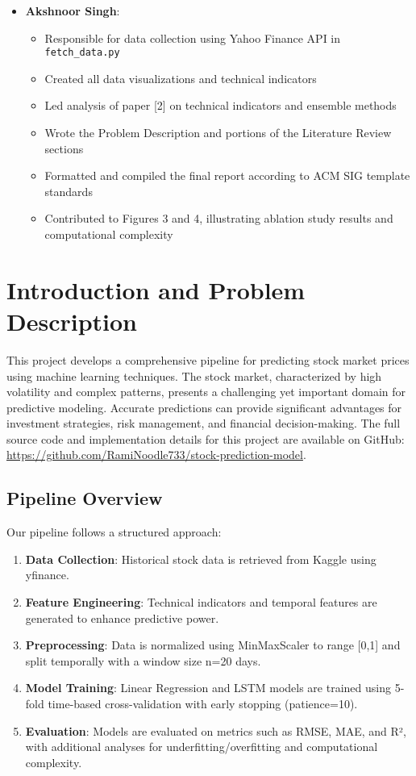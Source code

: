 \documentclass[sigconf]{acmart}
\begin{document}
\begin{itemize}
\item \textbf{Akshnoor Singh}: 
  \begin{itemize}
    \item Responsible for data collection using Yahoo Finance API in \texttt{fetch\_data.py}
    \item Created all data visualizations and technical indicators
    \item Led analysis of paper [2] on technical indicators and ensemble methods
    \item Wrote the Problem Description and portions of the Literature Review sections
    \item Formatted and compiled the final report according to ACM SIG template standards
    \item Contributed to Figures 3 and 4, illustrating ablation study results and computational complexity
  \end{itemize}
\end{itemize}

\section{Introduction and Problem Description}

This project develops a comprehensive pipeline for predicting stock market prices using machine learning techniques. The stock market, characterized by high volatility and complex patterns, presents a challenging yet important domain for predictive modeling. Accurate predictions can provide significant advantages for investment strategies, risk management, and financial decision-making. The full source code and implementation details for this project are available on GitHub: \url{https://github.com/RamiNoodle733/stock-prediction-model}.

\subsection{Pipeline Overview}

Our pipeline follows a structured approach:
\begin{enumerate}
\item \textbf{Data Collection}: Historical stock data is retrieved from Kaggle using yfinance.
\item \textbf{Feature Engineering}: Technical indicators and temporal features are generated to enhance predictive power.
\item \textbf{Preprocessing}: Data is normalized using MinMaxScaler to range [0,1] and split temporally with a window size n=20 days.
\item \textbf{Model Training}: Linear Regression and LSTM models are trained using 5-fold time-based cross-validation with early stopping (patience=10).
\item \textbf{Evaluation}: Models are evaluated on metrics such as RMSE, MAE, and R², with additional analyses for underfitting/overfitting and computational complexity.
\end{enumerate}
\end{document}
